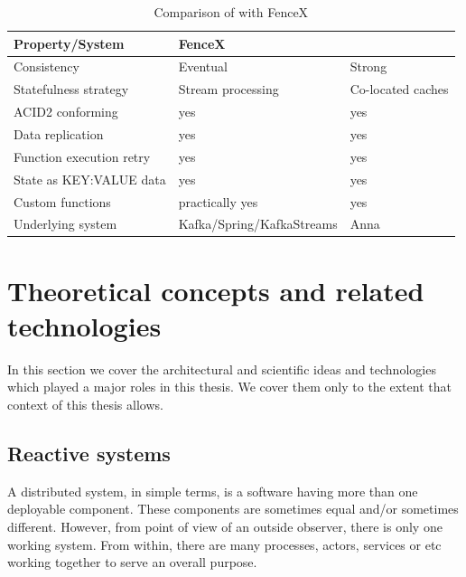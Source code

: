 \documentclass[a4]{report}
\begin{document}
    \begin{table}[h!]
        \begin{tabular}{ |l|l|l| }
            \hline
            Property/System          & FenceX                    & \cite{Functions-as-a-Service-2020} \\
            \hline
            Consistency              & Eventual                  & Strong                             \\
            Statefulness strategy    & Stream processing         & Co-located caches                  \\
            ACID2 conforming         & yes                       & yes                                \\
            Data replication         & yes                       & yes                                \\
            Function execution retry & yes                       & yes                                \\
            State as KEY:VALUE data  & yes                       & yes                                \\
            Custom functions         & practically yes           & yes                                \\
            Underlying system        & Kafka/Spring/KafkaStreams & Anna                               \\
            \hline
        \end{tabular}
        \caption{Comparison of  \cite{Functions-as-a-Service-2020} with FenceX}
        \label{table:fencex-comp}
    \end{table}
    

    \chapter{Theoretical concepts and related technologies}
    In this section we cover the architectural and scientific ideas and technologies which played a major roles in
    this thesis.
    We cover them only to the extent that context of this thesis allows.

    \section{Reactive systems}
    A distributed system, in simple terms, is a software having more than one deployable component.
    These components are sometimes equal and/or sometimes different.
    However, from point of view of an outside observer, there is only one working system.
    From within, there are many processes, actors, services or etc working together to serve an overall purpose.
\end{document}

